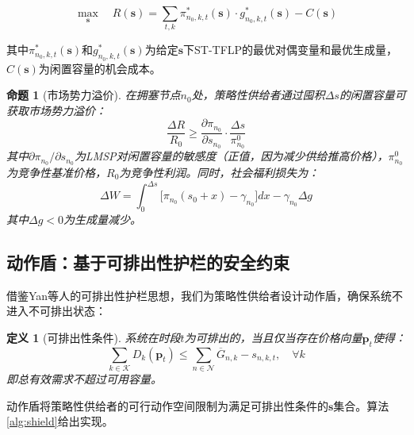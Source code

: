\documentclass[11pt,a4paper,twocolumn]{article}
\newtheorem{proposition}[theorem]{命题}
\newtheorem{definition}{定义}[section]
\begin{document}
\begin{equation}
\max_{\mathbf{s}} \quad R(\mathbf{s}) = \sum_{t,k} \pi_{n_0,k,t}^*(\mathbf{s}) \cdot g_{n_0,k,t}^*(\mathbf{s}) - C(\mathbf{s})
\label{eq:leader}
\end{equation}

其中$\pi_{n_0,k,t}^*(\mathbf{s})$和$g_{n_0,k,t}^*(\mathbf{s})$为给定$\mathbf{s}$下ST-TFLP的最优对偶变量和最优生成量，$C(\mathbf{s})$为闲置容量的机会成本。

\begin{proposition}[市场势力溢价]
\label{prop:market_power}
在拥塞节点$n_0$处，策略性供给者通过囤积$\Delta s$的闲置容量可获取市场势力溢价：
\begin{equation}
\frac{\Delta R}{R_0} \geq \frac{\partial \pi_{n_0}}{\partial s_{n_0}} \cdot \frac{\Delta s}{\pi_{n_0}^0}
\label{eq:premium}
\end{equation}
其中$\partial \pi_{n_0}/\partial s_{n_0}$为LMSP对闲置容量的敏感度（正值，因为减少供给推高价格），$\pi_{n_0}^0$为竞争性基准价格，$R_0$为竞争性利润。同时，社会福利损失为：
\begin{equation}
\Delta W = \int_0^{\Delta s} \bigl[\pi_{n_0}(s_0 + x) - \gamma_{n_0}\bigr] dx - \gamma_{n_0} \Delta g
\label{eq:welfare_loss}
\end{equation}
其中$\Delta g < 0$为生成量减少。
\end{proposition}

\subsection{动作盾：基于可排出性护栏的安全约束}

借鉴Yan等人\cite{yan2026stackelberg}的可排出性护栏思想，我们为策略性供给者设计动作盾，确保系统不进入不可排出状态：

\begin{definition}[可排出性条件]
\label{def:drainability}
系统在时段$t$为可排出的，当且仅当存在价格向量$\mathbf{p}_t$使得：
\begin{equation}
\sum_{k \in \mathcal{K}} D_k(\mathbf{p}_t) \leq \sum_{n \in \mathcal{N}} \overline{G}_{n,k} - s_{n,k,t}, \quad \forall k
\label{eq:drain}
\end{equation}
即总有效需求不超过可用容量。
\end{definition}

动作盾将策略性供给者的可行动作空间限制为满足可排出性条件的$\mathbf{s}$集合。算法\ref{alg:shield}给出实现。
\end{document}

